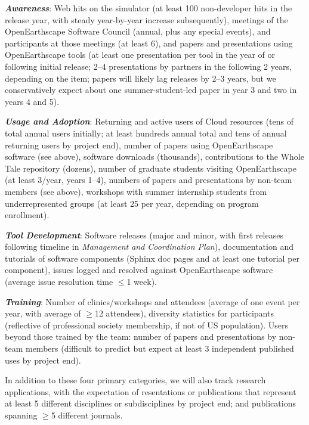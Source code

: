\textit{\textbf{Awareness}}: Web hits on the simulator (at least 100 non-developer hits in the release year, with steady year-by-year increase subsequently), meetings of the OpenEarthscape Software Council (annual, plus any special events), and participants at those meetings (at least 6), and papers and presentations using OpenEarthscape tools (at least one presentation per tool in the year of or following initial release; 2--4 presentations by partners in the following 2 years, depending on the item; papers will likely lag releases by 2--3 years, but we conservatively expect about one summer-student-led paper in year 3 and two in years 4 and 5).

\textit{\textbf{Usage and Adoption}}: Returning and active users of Cloud resources (tens of total annual users initially; at least hundreds annual total and tens of annual returning users by project end), number of papers using OpenEarthscape software (see above), software downloads (thousands), contributions to the Whole Tale repository (dozens), number of graduate students visiting OpenEarthscape (at least 3/year, years 1--4), numbers of papers and presentations by non-team members (see above), workshops with summer internship students from underrepresented groups (at least 25 per year, depending on program enrollment).

\textit{\textbf{Tool Development}}: Software releases (major and minor, with first releases following timeline in \textit{Management and Coordination Plan}), documentation and tutorials of software components (Sphinx doc pages and at least one tutorial per component), issues logged and resolved against OpenEarthscape software (average issue resolution time $\le$1 week).

\textit{\textbf{Training}}: Number of clinics/workshops and attendees (average of one event per year, with average of $\ge$12 attendees), diversity statistics for participants (reflective of professional society membership, if not of US population). Users beyond those trained by the team: number of papers and presentations by non-team members (difficult to predict but expect at least 3 independent published uses by project end).%

In addition to these four primary categories, we will also track research applications, with the expectation of  resentations or publications that represent at least 5 different disciplines or subdisciplines by project end; and  publications spanning $\ge$5 different journals.

